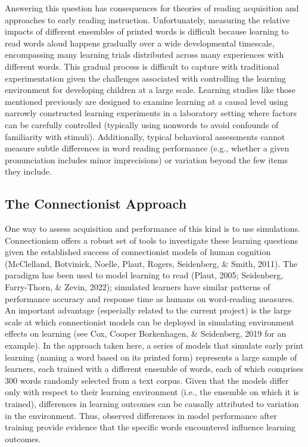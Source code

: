\documentclass[
  ,man,floatsintext]{apa6}
\begin{document}
Answering this question has consequences for theories of reading acquisition and approaches to early reading instruction. Unfortunately, measuring the relative impacts of different ensembles of printed words is difficult because learning to read words aloud happens gradually over a wide developmental timescale, encompassing many learning trials distributed across many experiences with different words. This gradual process is difficult to capture with traditional experimentation given the challenges associated with controlling the learning environment for developing children at a large scale. Learning studies like those mentioned previously are designed to examine learning at a causal level using narrowly constructed learning experiments in a laboratory setting where factors can be carefully controlled (typically using nonwords to avoid confounds of familiarity with stimuli). Additionally, typical behavioral assessments cannot measure subtle differences in word reading performance (e.g., whether a given pronunciation includes minor imprecisions) or variation beyond the few items they include.

\subsection{The Connectionist Approach}\label{the-connectionist-approach}

One way to assess acquisition and performance of this kind is to use simulations. Connectionism offers a robust set of tools to investigate these learning questions given the established success of connectionist models of human cognition (McClelland, Botvinick, Noelle, Plaut, Rogers, Seidenberg, \& Smith, 2011). The paradigm has been used to model learning to read (Plaut, 2005; Seidenberg, Farry-Thorn, \& Zevin, 2022); simulated learners have similar patterns of performance accuracy and response time as humans on word-reading measures. An important advantage (especially related to the current project) is the large scale at which connectionist models can be deployed in simulating environment effects on learning (see Cox, Cooper Borkenhagen, \& Seidenberg, 2019 for an example). In the approach taken here, a series of models that simulate early print learning (naming a word based on its printed form) represents a large sample of learners, each trained with a different ensemble of words, each of which comprises 300 words randomly selected from a text corpus. Given that the models differ only with respect to their learning environment (i.e., the ensemble on which it is trained), differences in learning outcomes can be causally attributed to variation in the environment. Thus, observed differences in model performance after training provide evidence that the specific words encountered influence learning outcomes.
\end{document}
